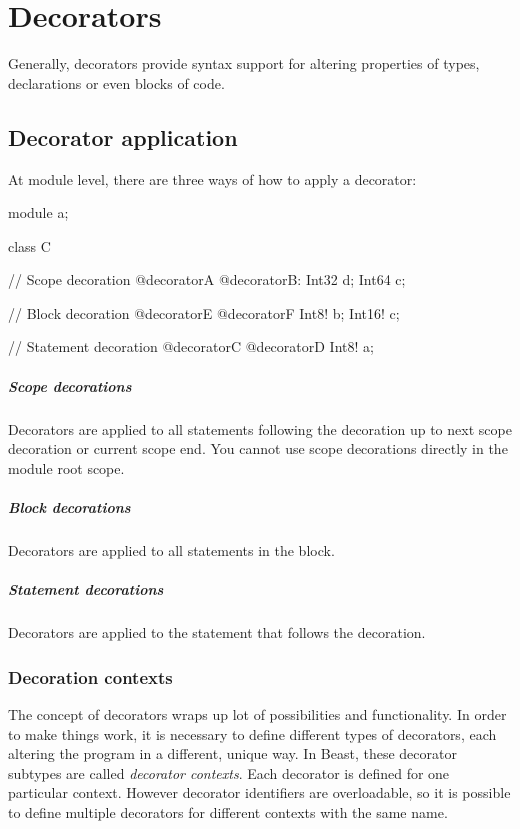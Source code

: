 \chapter{Decorators}

\begin{grammar}
	  
\end{grammar}

Generally, decorators provide syntax support for altering properties of types, declarations or even blocks of code.

\section{Decorator application}
At module level, there are three ways of how to apply a decorator:
\begin{code}
module a;

class C {
	
// Scope decoration
@decoratorA @decoratorB:
	Int32 d;
	Int64 c;
	
	// Block decoration
	@decoratorE @decoratorF {
		Int8! b;
		Int16! c;	
	}
	
	// Statement decoration
	@decoratorC @decoratorD Int8! a;
				
}
\end{code}

\paragraph{Scope decorations} Decorators are applied to all statements following the decoration up to next scope decoration or current scope end. You cannot use scope decorations directly in the module root scope.

\paragraph{Block decorations} Decorators are applied to all statements in the block.

\paragraph{Statement decorations} Decorators are applied to the statement that follows the decoration.

\subsection{Decoration contexts} \label{decorationContexts}
The concept of decorators wraps up lot of possibilities and functionality. In order to make things work, it is necessary to define different types of decorators, each altering the program in a different, unique way. In Beast, these decorator subtypes are called \textit{decorator contexts}. Each decorator is defined for one particular context. However decorator identifiers are overloadable, so it is possible to define multiple decorators for different contexts with the same name.

